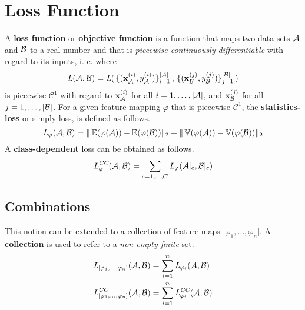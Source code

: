 \section{Loss Function}
A \textbf{loss function} or \textbf{objective function} is a function that maps two data sets $\mathcal A$ and $\mathcal B$ to a real number and that is \textit{piecewise continuously differentiable} with regard to its inputs,
i. e. where 
\[
    \textit{L} (\mathcal A, \mathcal B) = \textit{L} (
    \,\{(\mathbf x^{(i)}_{\mathcal A}, y^{(i)}_{\mathcal A})\}_{i=1}^{|\mathcal A|}\,,
    \,\{(\mathbf x^{(j)}_{\mathcal B}, y^{(j)}_{\mathcal B})\}_{j=1}^{|\mathcal B|}\,) 
\]
is piecewise $\mathcal C^1$ with regard to $\mathbf x^{(i)}_{\mathcal A}$
for all $i=1, \dots, |\mathcal A|$, and $\mathbf x^{(j)}_{\mathcal B}$ for all $j=1, \dots, |\mathcal B|$.
%
For a given feature-mapping $\varphi$ that is piecewise $\mathcal C ^1$, the \textbf{statistics-loss} or simply loss, is defined as follows.
% 
\begin{equation}
    \textit{L} _{\varphi} (\mathcal A, \mathcal B) = 
    \|\operatorname{\mathbb{E}} ({\varphi (\mathcal A)}) - \operatorname{\mathbb{E}} ({\varphi (\mathcal B)})\|_2 +
    \|\operatorname{\mathbb{V}} ({\varphi (\mathcal A)}) - \operatorname{\mathbb{V}} ({\varphi (\mathcal B)})\|_2
    \label{eqn:statistics_loss}
\end{equation}
% 
A \textbf{class-dependent} loss can be obtained as follows.
\begin{align}
\begin{split}
\label{eqn:class_statistics_loss}
    \textit{L}^\textit{CC} _\varphi (\mathcal A, \mathcal B) =
    \sum _{c = 1, \dots, C}
    \textit{L}_\varphi(\mathcal A|_c, \mathcal B|_c)
\end{split}
\end{align}

\subsection{Combinations}

This notion can be extended to a collection of feature-maps [$\varphi_1, \dots, \varphi_n$].
A \textbf{collection} is used to refer to a \textit{non-empty finite} set.
\begin{align*}
    \textit{L}_{[\varphi_1, \dots, \varphi_n]} (\mathcal A, \mathcal B) &= 
    \sum_{i=1}^n \textit{L}_{\varphi_i} (\mathcal A, \mathcal B) \\
    \textit{L}^\textit{CC}_{[\varphi_1, \dots, \varphi_n]} (\mathcal A, \mathcal B) &= 
    \sum_{i=1}^n \textit{L}^\textit{CC}_{\varphi_i} (\mathcal A, \mathcal B)
\end{align*}

